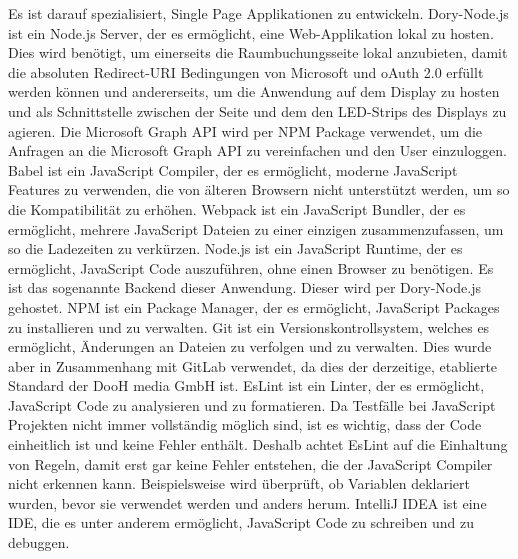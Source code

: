 Es ist darauf spezialisiert, Single Page Applikationen zu entwickeln.
\newline
\newline
Dory-Node.js ist ein Node.js Server, der es ermöglicht, eine Web-Applikation lokal zu hosten.
Dies wird benötigt, um einerseits die Raumbuchungsseite lokal anzubieten, damit die absoluten Redirect-URI Bedingungen von Microsoft und oAuth 2.0 erfüllt werden können und andererseits, um die Anwendung auf dem Display zu hosten und als Schnittstelle zwischen der Seite und dem den LED-Strips des Displays zu agieren.
\newline
\newline
Die Microsoft Graph API wird per NPM Package verwendet, um die Anfragen an die Microsoft Graph API zu vereinfachen und den User einzuloggen.
\newline
\newline
Babel ist ein JavaScript Compiler, der es ermöglicht, moderne JavaScript Features zu verwenden, die von älteren Browsern nicht unterstützt werden, um so die Kompatibilität zu erhöhen.
\newline
\newline
Webpack ist ein JavaScript Bundler, der es ermöglicht, mehrere JavaScript Dateien zu einer einzigen zusammenzufassen, um so die Ladezeiten zu verkürzen.
\newline
\newline
Node.js ist ein JavaScript Runtime, der es ermöglicht, JavaScript Code auszuführen, ohne einen Browser zu benötigen.
Es ist das sogenannte Backend dieser Anwendung.
Dieser wird per Dory-Node.js gehostet.
\newline
\newline
NPM ist ein Package Manager, der es ermöglicht, JavaScript Packages zu installieren und zu verwalten.
\newline
\newline
Git ist ein Versionskontrollsystem, welches es ermöglicht, Änderungen an Dateien zu verfolgen und zu verwalten.
Dies wurde aber in Zusammenhang mit GitLab verwendet, da dies der derzeitige, etablierte Standard der DooH media GmbH ist.
\newline
\newline
EsLint ist ein Linter, der es ermöglicht, JavaScript Code zu analysieren und zu formatieren.
Da Testfälle bei JavaScript Projekten nicht immer vollständig möglich sind, ist es wichtig, dass der Code einheitlich ist und keine Fehler enthält.
Deshalb achtet EsLint auf die Einhaltung von Regeln, damit erst gar keine Fehler entstehen, die der JavaScript Compiler nicht erkennen kann.
Beispielsweise wird überprüft, ob Variablen deklariert wurden, bevor sie verwendet werden und anders herum.
\newline
\newline
IntelliJ IDEA ist eine IDE, die es unter anderem ermöglicht, JavaScript Code zu schreiben und zu debuggen.
\newline
\newline


